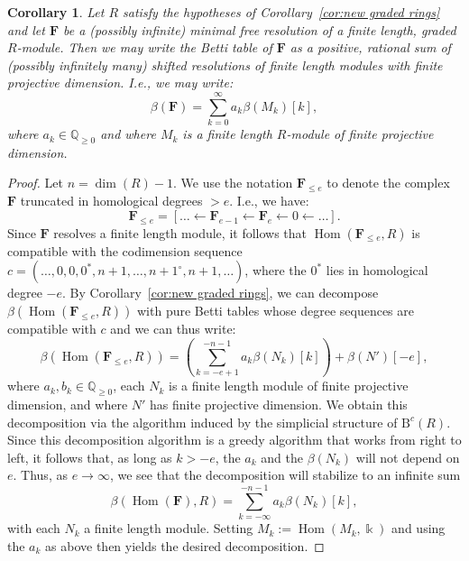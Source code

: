 \documentclass[12pt]{amsart}
\newtheorem{cor}[lemma]{Corollary}
\theoremstyle{definition}
\theoremstyle{remark}
\newtheorem{example}[lemma]{Example}
\newcommand{\Hom}{\operatorname{Hom}} %
\newcommand{\kk}{\Bbbk}
\newcommand{\QQ}{\mathbb{Q}}
\newcommand{\cc}{c}
\newcommand{\FF}{\mathbf{F}}
\newcommand{\zp}{\circ}
\newcommand{\BBQ}{\mathrm{B}}
\begin{document}
\begin{cor}\label{cor:decomp infinite}
Let $R$ satisfy the hypotheses of Corollary~\ref{cor:new graded rings} and let $\FF$ be a (possibly infinite) minimal free resolution of a finite length, graded $R$-module.  Then we may write the Betti table of $\FF$ as a positive, rational sum of (possibly infinitely many) shifted resolutions of finite length modules with finite projective dimension.  I.e., we may write:
\[
\beta(\FF)=\sum_{k=0}^\infty a_k\beta(M_k)[k],
\]
where $a_k\in \QQ_{\geq 0}$ and where $M_k$ is a finite length $R$-module of finite projective dimension.
\end{cor}
\begin{proof}
Let $n=\dim(R)-1$.  We use the notation $\FF_{\leq e}$ to denote the complex $\FF$ truncated in homological degrees $>e$.  I.e., we have:
\[
\FF_{\leq e}=[\dots \gets \FF_{e-1}\gets \FF_e \gets 0 \gets \dots].
\]
Since $\FF$ resolves a finite length module, it follows that $\Hom(\FF_{\leq e},R)$ is compatible with the codimension sequence $\cc=(\dots,0,0,0^*,n+1,\dots, n+1^\zp, n+1,\dots)$, where the $0^*$ lies in homological degree $-e$.  By Corollary~\ref{cor:new graded rings}, we can decompose $\beta(\Hom(\FF_{\leq e},R))$ with pure Betti tables whose degree sequences are compatible with $\cc$ and we can thus write:
\[
\beta(\Hom(\FF_{\leq e},R))=\left(\sum_{k=-e+1}^{-n-1} a_k\beta(N_k)[k]\right)+\beta(N')[-e],
\]
where $a_k,b_k\in \QQ_{\geq 0}$, each $N_k$ is a finite length module of finite projective dimension, and where $N'$ has finite projective dimension.  We obtain this decomposition via the algorithm induced by the simplicial structure of $\BBQ^{\cc}(R)$.  Since this decomposition algorithm is a greedy algorithm that works from right to left, it follows that, as long as $k>-e$, the $a_k$ and the $\beta(N_k)$ will not depend on $e$.  Thus, as $e\to \infty$, we see that the decomposition will stabilize to an infinite sum
\[
\beta(\Hom(\FF),R)=\sum_{k=-\infty}^{-n-1} a_k\beta(N_k)[k],
\]
with each $N_k$ a finite length module.  Setting $M_k:=\Hom(M_k,\kk)$ and using the $a_k$ as above then yields the desired decomposition.
\end{proof}
%
\end{document}
